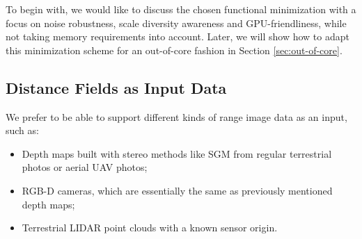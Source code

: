 \documentclass[10pt,twocolumn,letterpaper]{article}
\begin{document}
To begin with, we would like to discuss the chosen functional minimization with a focus on noise robustness, scale diversity awareness and GPU-friendliness, while not taking memory requirements into account. Later, we will show how to adapt this minimization scheme for an out-of-core fashion in Section \ref{sec:out-of-core}.

\subsection{Distance Fields as Input Data}
\label{sec:dist-fields-as-input-data}

We prefer to be able to support different kinds of range image data as an input, such as:

\begin{itemize}
    \item Depth maps built with stereo methods like SGM \cite{hirschmuller2007stereo} from regular terrestrial photos or aerial UAV photos;
    \item RGB-D cameras, which are essentially the same as previously mentioned depth maps;
    \item Terrestrial LIDAR point clouds with a known sensor origin.
\end{itemize}
\end{document}

